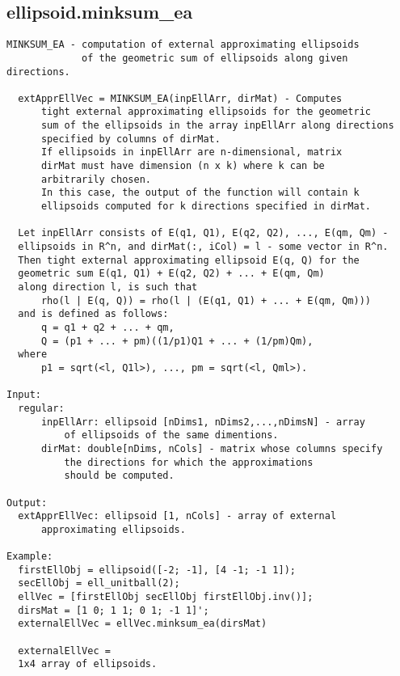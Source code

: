 \subsection{\texorpdfstring{ellipsoid.minksum\_ea}{minksum\_ea}}\label{method:ellipsoid.minksumea}
\begin{verbatim}
MINKSUM_EA - computation of external approximating ellipsoids
             of the geometric sum of ellipsoids along given directions.

  extApprEllVec = MINKSUM_EA(inpEllArr, dirMat) - Computes
      tight external approximating ellipsoids for the geometric
      sum of the ellipsoids in the array inpEllArr along directions
      specified by columns of dirMat.
      If ellipsoids in inpEllArr are n-dimensional, matrix
      dirMat must have dimension (n x k) where k can be
      arbitrarily chosen.
      In this case, the output of the function will contain k
      ellipsoids computed for k directions specified in dirMat.

  Let inpEllArr consists of E(q1, Q1), E(q2, Q2), ..., E(qm, Qm) -
  ellipsoids in R^n, and dirMat(:, iCol) = l - some vector in R^n.
  Then tight external approximating ellipsoid E(q, Q) for the
  geometric sum E(q1, Q1) + E(q2, Q2) + ... + E(qm, Qm)
  along direction l, is such that
      rho(l | E(q, Q)) = rho(l | (E(q1, Q1) + ... + E(qm, Qm)))
  and is defined as follows:
      q = q1 + q2 + ... + qm,
      Q = (p1 + ... + pm)((1/p1)Q1 + ... + (1/pm)Qm),
  where
      p1 = sqrt(<l, Q1l>), ..., pm = sqrt(<l, Qml>).

Input:
  regular:
      inpEllArr: ellipsoid [nDims1, nDims2,...,nDimsN] - array
          of ellipsoids of the same dimentions.
      dirMat: double[nDims, nCols] - matrix whose columns specify
          the directions for which the approximations
          should be computed.

Output:
  extApprEllVec: ellipsoid [1, nCols] - array of external
      approximating ellipsoids.

Example:
  firstEllObj = ellipsoid([-2; -1], [4 -1; -1 1]);
  secEllObj = ell_unitball(2);
  ellVec = [firstEllObj secEllObj firstEllObj.inv()];
  dirsMat = [1 0; 1 1; 0 1; -1 1]';
  externalEllVec = ellVec.minksum_ea(dirsMat)

  externalEllVec =
  1x4 array of ellipsoids.
\end{verbatim}
